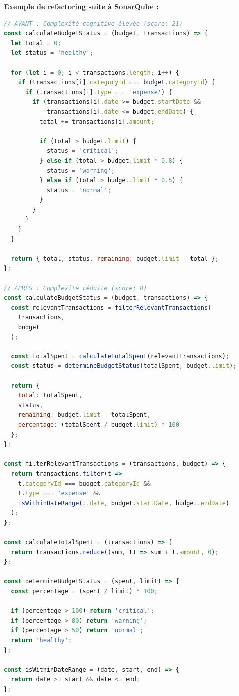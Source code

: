 \begin{exemple}
\textbf{Exemple de refactoring suite à SonarQube :}
\begin{lstlisting}[language=JavaScript]
// AVANT : Complexité cognitive élevée (score: 21)
const calculateBudgetStatus = (budget, transactions) => {
  let total = 0;
  let status = 'healthy';
  
  for (let i = 0; i < transactions.length; i++) {
    if (transactions[i].categoryId === budget.categoryId) {
      if (transactions[i].type === 'expense') {
        if (transactions[i].date >= budget.startDate && 
            transactions[i].date <= budget.endDate) {
          total += transactions[i].amount;
          
          if (total > budget.limit) {
            status = 'critical';
          } else if (total > budget.limit * 0.8) {
            status = 'warning';
          } else if (total > budget.limit * 0.5) {
            status = 'normal';
          }
        }
      }
    }
  }
  
  return { total, status, remaining: budget.limit - total };
};

// APRÈS : Complexité réduite (score: 8)
const calculateBudgetStatus = (budget, transactions) => {
  const relevantTransactions = filterRelevantTransactions(
    transactions, 
    budget
  );
  
  const totalSpent = calculateTotalSpent(relevantTransactions);
  const status = determineBudgetStatus(totalSpent, budget.limit);
  
  return {
    total: totalSpent,
    status,
    remaining: budget.limit - totalSpent,
    percentage: (totalSpent / budget.limit) * 100
  };
};

const filterRelevantTransactions = (transactions, budget) => {
  return transactions.filter(t => 
    t.categoryId === budget.categoryId &&
    t.type === 'expense' &&
    isWithinDateRange(t.date, budget.startDate, budget.endDate)
  );
};

const calculateTotalSpent = (transactions) => {
  return transactions.reduce((sum, t) => sum + t.amount, 0);
};

const determineBudgetStatus = (spent, limit) => {
  const percentage = (spent / limit) * 100;
  
  if (percentage > 100) return 'critical';
  if (percentage > 80) return 'warning';
  if (percentage > 50) return 'normal';
  return 'healthy';
};

const isWithinDateRange = (date, start, end) => {
  return date >= start && date <= end;
};
\end{lstlisting}
\end{exemple}

